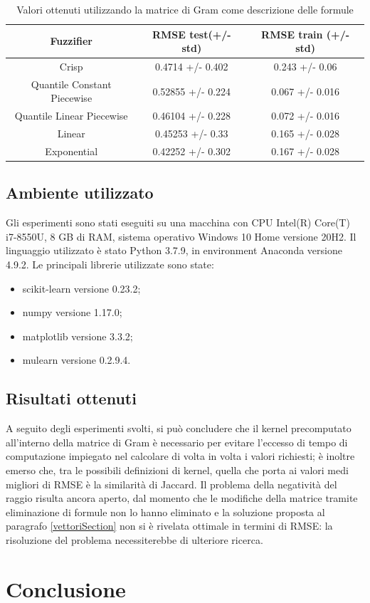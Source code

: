 \documentclass[12pt,a4paper]{report}
\begin{document}
\begin{table}[h!]
\small
\centering 	
	\begin{tabular}{|c|c|c|} 
	 \hline
	  Fuzzifier & RMSE test(+/- std) & RMSE train (+/- std)\\ [0.5ex] 
	 \hline
	 Crisp & 0.4714  +/- 0.402 & 0.243 +/- 0.06 \\ 
	 \hline
	 Quantile Constant Piecewise & 0.52855  +/- 0.224 & 0.067 +/- 0.016\\
	 \hline
	 Quantile Linear Piecewise & 0.46104  +/- 0.228	& 0.072 +/- 0.016\\
	 \hline
	 Linear &0.45253  +/- 0.33 & 0.165 +/- 0.028\\
	 \hline
	 Exponential & 0.42252  +/- 0.302 & 0.167 +/-  0.028\\ [1ex] 
	 \hline
	\end{tabular}
	\caption{Valori ottenuti utilizzando la matrice di Gram come descrizione delle formule}
	\label{table:risultatiVettore}
\end{table}

\section{Ambiente utilizzato}
Gli esperimenti sono stati eseguiti su una macchina con CPU Intel(R) Core(T) i7-8550U, 8 GB di RAM, sistema operativo Windows 10 Home versione 20H2. 
Il linguaggio utilizzato è stato Python 3.7.9, in environment Anaconda \cite{anaconda} versione 4.9.2.
Le principali librerie utilizzate sono state:
\begin{itemize}
\item scikit-learn \cite{scikit-learn} versione 0.23.2;
\item numpy \cite{numpy} versione 1.17.0;
\item matplotlib \cite{matplotlib} versione 3.3.2;
\item mulearn \cite{mulearn} versione 0.2.9.4.
\end{itemize}
\section{Risultati ottenuti}
A seguito degli esperimenti svolti, si può concludere che il kernel precomputato all'interno della matrice di Gram è necessario per evitare l'eccesso di tempo di computazione impiegato nel calcolare di volta in volta i valori richiesti; è inoltre emerso che, tra le possibili definizioni di kernel, quella che porta ai valori medi migliori di RMSE è la similarità di Jaccard.
Il problema della negatività del raggio risulta ancora aperto, dal momento che le modifiche della matrice tramite eliminazione di formule non lo hanno eliminato e la soluzione proposta al paragrafo \ref{vettoriSection} non si è rivelata ottimale in termini di RMSE: la risoluzione del problema necessiterebbe di ulteriore ricerca.

\chapter*{Conclusione}



\end{document}
